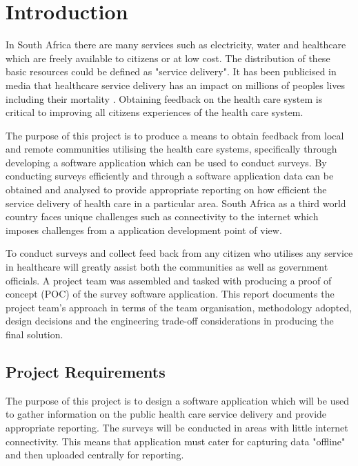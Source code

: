 \documentclass[12pt]{witseiepaper}
\begin{document}
\section{Introduction}

In South Africa there are many services such as electricity, water and healthcare which are freely available to citizens or at low cost. The distribution of these basic resources could be defined as "service delivery". It has been publicised in media that healthcare service delivery has an impact on millions of peoples lives including their mortality \cite{InfantsDie}. Obtaining feedback on the health care system is critical to improving all citizens experiences of the health care system.

The purpose of this project is to produce a means to obtain feedback from local and remote communities utilising the health care systems, specifically through developing a software application which can be used to conduct surveys. By conducting surveys efficiently and through a software application data can be obtained and analysed to provide appropriate reporting on how efficient the service delivery of health care in a particular area. South Africa as a third world country faces unique challenges such as connectivity to the internet \cite{Internet} which imposes challenges from a application development point of view. 

To conduct surveys and collect feed back from any citizen who utilises any service in healthcare will greatly assist both the communities as well as government officials. A project team was assembled and tasked with producing a proof of concept (POC) of the survey software application. This report documents the project team's approach in terms of the team organisation, methodology adopted, design decisions and the engineering trade-off considerations in producing the final solution.

\subsection{Project Requirements}

The purpose of this project is to design a software application which will be used to gather information on the public health care service delivery and provide appropriate reporting. The surveys will be conducted in areas with little internet connectivity. This means that application must cater for capturing data "offline" and then uploaded centrally for reporting.\\
\end{document}
